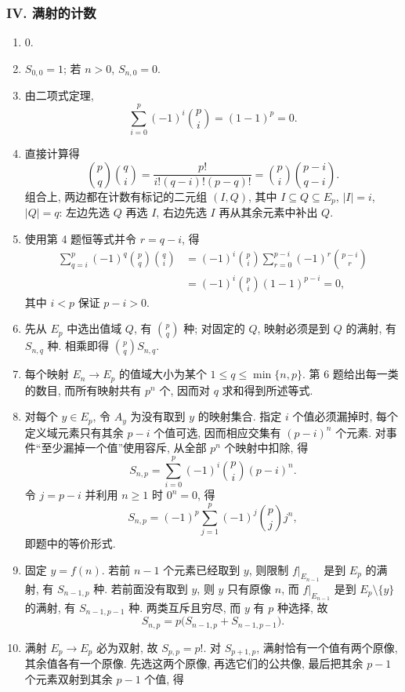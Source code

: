 \documentclass[usesamecnt, thmcnt=section, lang=cn, newtx, 10pt, scheme=chinese]{elegantbook}
\begin{document}
\subsubsection*{IV. 满射的计数}
\begin{enumerate}[label=\textbf{\arabic*.}, start=17]
  \item $0$.
  \item $S_{0,0}=1$; 若 $n>0$, $S_{n,0}=0$.
  \item 由二项式定理,
  \[
   \sum_{i=0}^{p}(-1)^i\binom pi=(1-1)^p=0.
  \]
  \item 直接计算得
  \[
   \binom pq\binom qi
   =\frac{p!}{i!(q-i)!(p-q)!}
   =\binom pi\binom{p-i}{q-i}.
  \]
  组合上, 两边都在计数有标记的二元组 $(I,Q)$, 其中 $I\subseteq Q\subseteq E_p$, $|I|=i$, $|Q|=q$: 左边先选 $Q$ 再选 $I$, 右边先选 $I$ 再从其余元素中补出 $Q$.
  \item 使用第 4 题恒等式并令 $r=q-i$, 得
  \[
  \begin{aligned}
   \sum_{q=i}^{p}(-1)^q\binom pq\binom qi
   &=(-1)^i\binom pi
     \sum_{r=0}^{p-i}(-1)^r\binom{p-i}{r}\\
   &=(-1)^i\binom pi(1-1)^{p-i}=0,
  \end{aligned}
  \]
  其中 $i<p$ 保证 $p-i>0$.
  \item 先从 $E_p$ 中选出值域 $Q$, 有 $\binom pq$ 种; 对固定的 $Q$, 映射必须是到 $Q$ 的满射, 有 $S_{n,q}$ 种. 相乘即得 $\binom pqS_{n,q}$.
  \item 每个映射 $E_n\to E_p$ 的值域大小为某个 $1\leq q\leq\min\{n,p\}$. 第 6 题给出每一类的数目, 而所有映射共有 $p^n$ 个, 因而对 $q$ 求和得到所述等式.
  \item 对每个 $y\in E_p$, 令 $A_y$ 为没有取到 $y$ 的映射集合. 指定 $i$ 个值必须漏掉时, 每个定义域元素只有其余 $p-i$ 个值可选, 因而相应交集有 $(p-i)^n$ 个元素. 对事件``至少漏掉一个值''使用容斥, 从全部 $p^n$ 个映射中扣除, 得
  \[
   S_{n,p}=\sum_{i=0}^{p}(-1)^i\binom pi(p-i)^n.
  \]
  令 $j=p-i$ 并利用 $n\geq1$ 时 $0^n=0$, 得
  \[
   S_{n,p}=(-1)^p\sum_{j=1}^{p}(-1)^j\binom pjj^n,
  \]
  即题中的等价形式.
  \item 固定 $y=f(n)$. 若前 $n-1$ 个元素已经取到 $y$, 则限制 $f|_{E_{n-1}}$ 是到 $E_p$ 的满射, 有 $S_{n-1,p}$ 种. 若前面没有取到 $y$, 则 $y$ 只有原像 $n$, 而 $f|_{E_{n-1}}$ 是到 $E_p\setminus\{y\}$ 的满射, 有 $S_{n-1,p-1}$ 种. 两类互斥且穷尽, 而 $y$ 有 $p$ 种选择, 故
  \[
   S_{n,p}=p\bigl(S_{n-1,p}+S_{n-1,p-1}\bigr).
  \]
  \item 满射 $E_p\to E_p$ 必为双射, 故 $S_{p,p}=p!$. 对 $S_{p+1,p}$, 满射恰有一个值有两个原像, 其余值各有一个原像. 先选这两个原像, 再选它们的公共像, 最后把其余 $p-1$ 个元素双射到其余 $p-1$ 个值, 得

\end{enumerate}
\end{document}
